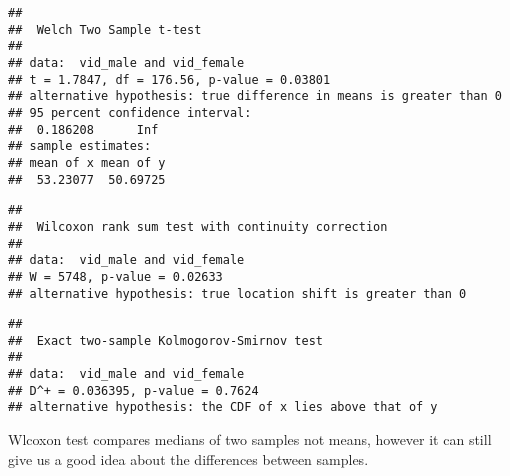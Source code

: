 \documentclass[
]{article}
\newenvironment{Shaded}{\begin{snugshade}}{\end{snugshade}}
\newcommand{\AttributeTok}[1]{\textcolor[rgb]{0.13,0.29,0.53}{#1}}
\newcommand{\DecValTok}[1]{\textcolor[rgb]{0.00,0.00,0.81}{#1}}
\newcommand{\FunctionTok}[1]{\textcolor[rgb]{0.13,0.29,0.53}{\textbf{#1}}}
\newcommand{\NormalTok}[1]{#1}
\newcommand{\OtherTok}[1]{\textcolor[rgb]{0.56,0.35,0.01}{#1}}
\newcommand{\SpecialCharTok}[1]{\textcolor[rgb]{0.81,0.36,0.00}{\textbf{#1}}}
\newcommand{\StringTok}[1]{\textcolor[rgb]{0.31,0.60,0.02}{#1}}
\begin{document}
\begin{Shaded}
\end{Shaded}

\begin{verbatim}
## 
##  Welch Two Sample t-test
## 
## data:  vid_male and vid_female
## t = 1.7847, df = 176.56, p-value = 0.03801
## alternative hypothesis: true difference in means is greater than 0
## 95 percent confidence interval:
##  0.186208      Inf
## sample estimates:
## mean of x mean of y 
##  53.23077  50.69725
\end{verbatim}

\begin{verbatim}
## 
##  Wilcoxon rank sum test with continuity correction
## 
## data:  vid_male and vid_female
## W = 5748, p-value = 0.02633
## alternative hypothesis: true location shift is greater than 0
\end{verbatim}

\begin{verbatim}
## 
##  Exact two-sample Kolmogorov-Smirnov test
## 
## data:  vid_male and vid_female
## D^+ = 0.036395, p-value = 0.7624
## alternative hypothesis: the CDF of x lies above that of y
\end{verbatim}

Wlcoxon test compares medians of two samples not means, however it can
still give us a good idea about the differences between samples.
\end{document}
